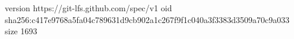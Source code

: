 version https://git-lfs.github.com/spec/v1
oid sha256:c417e9768a5fa04c789631d9cb902a1c267f9f1c040a3f3383d3509a70c9a033
size 1693
